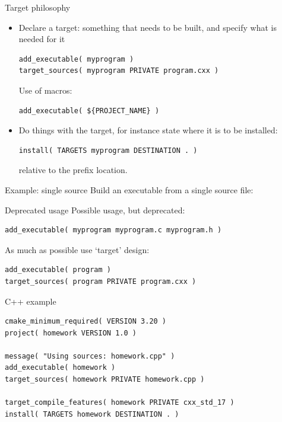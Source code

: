 \begin{numberedframe}{Target philosophy}
  \begin{itemize}
  \item Declare a target: something that needs to be built,
    and specify what is needed for it
\begin{lstlisting}
add_executable( myprogram )
target_sources( myprogram PRIVATE program.cxx )
\end{lstlisting}
Use of macros:
\begin{lstlisting}
add_executable( ${PROJECT_NAME} )
\end{lstlisting}
\item Do things with the target, for instance state where it
  is to be installed:
\begin{lstlisting}
install( TARGETS myprogram DESTINATION . )
\end{lstlisting}
relative to the prefix location.
  \end{itemize}
\end{numberedframe}

\begin{numberedframe}{Example: single source}
  Build an executable from a single source file:
  
  
\end{numberedframe}

\begin{numberedframe}{Deprecated usage}
Possible usage, but deprecated:
\begin{lstlisting}
add_executable( myprogram myprogram.c myprogram.h )
\end{lstlisting}
As much as possible use `target' design:
\begin{lstlisting}
add_executable( program )
target_sources( program PRIVATE program.cxx )
\end{lstlisting}
\end{numberedframe}

\begin{numberedframe}{C++ example}
\begin{lstlisting}
cmake_minimum_required( VERSION 3.20 )
project( homework VERSION 1.0 )

message( "Using sources: homework.cpp" )
add_executable( homework )
target_sources( homework PRIVATE homework.cpp )

target_compile_features( homework PRIVATE cxx_std_17 )
install( TARGETS homework DESTINATION . )
\end{lstlisting}
\end{numberedframe}

